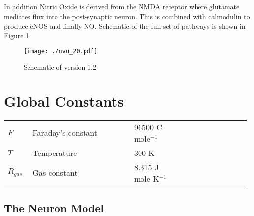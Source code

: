 \documentclass[fleqn]{report}
\numberwithin{equation}{section}
\numberwithin{equation}{section}
\newcommand{\Na}{\text{Na$^{+}$}}
\newcommand{\Glu}{\text{Glu}}
\newcommand{\K}{\text{K$^+$}}
\newcommand{\Ca}{\text{Ca$^{2+}$}}
\begin{document}
 
 In addition Nitric Oxide is derived from the NMDA receptor where glutamate mediates \Ca flux into the post-synaptic neuron. This \Ca is combined with calmodulin to produce eNOS and finally NO.  Schematic of the full set of pathways is shown in Figure \ref{fig:nvu_FULL}
 				 \begin{figure}[h!]
 				\centering
 				\texttt{[image: ./nvu\_20.pdf]}
 				\caption{Schematic of version 1.2}
 				\label{fig:nvu_FULL}
 				\end{figure}


\section{\textbf{Global Constants}}\label{sec:equations}
	\begin{table}[h!]
		\centering
			\begin{tabular}{ p{0.1\linewidth}  >{\footnotesize} p{0.41\linewidth}  >{\footnotesize} p{0.20\linewidth} >{\footnotesize} p{0.27\linewidth} }
			\hline
			$ F $				& Faraday's constant 	& 96500 C mole$^{-1}$ & 	\\
			$ T $				& Temperature				& 300 K				 		&	\\
			$ R_{gas} $	  & Gas constant				& 8.315 J mole K$^{-1}$ &  	\\

			\hline
		\end{tabular}
	\end{table}
	

				\subsection{The Neuron Model}
\end{document}
